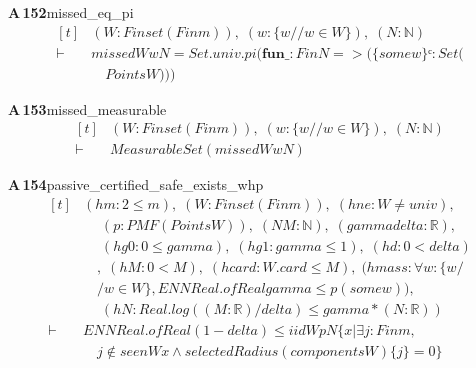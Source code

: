 \documentclass[conference]{IEEEtran}
\theoremstyle{definition}
\newcommand{\lean}[1]{\textsf{\footnotesize #1}}
\begin{document}
\noindent\textbf{A\,152}\quad\lean{missed\_eq\_pi}
{\footnotesize\[ \begin{aligned}[t]
&(\mathit{W} : \mathit{Finset} (\mathit{Fin} \mathit{m})),\; (\mathit{w} : \{ \mathit{w} // \mathit{w} \in \mathit{W}\} ),\; (\mathit{N} : \mathbb{N} )\\
\vdash\;&\mathit{missed} \mathit{W} \mathit{w} \mathit{N} = \mathit{Set}.\mathit{univ}.\mathit{pi} (\mathbf{fun} \mathit{\_} : \mathit{Fin} \mathit{N} => (\{ \mathit{some} \mathit{w}\} ᶜ : \mathit{Set} (\\
&\quad \mathit{Points} \mathit{W})))
\end{aligned} \]}

\noindent\textbf{A\,153}\quad\lean{missed\_measurable}
{\footnotesize\[ \begin{aligned}[t]
&(\mathit{W} : \mathit{Finset} (\mathit{Fin} \mathit{m})),\; (\mathit{w} : \{ \mathit{w} // \mathit{w} \in \mathit{W}\} ),\; (\mathit{N} : \mathbb{N} )\\
\vdash\;&\mathit{MeasurableSet} (\mathit{missed} \mathit{W} \mathit{w} \mathit{N})
\end{aligned} \]}

\noindent\textbf{A\,154}\quad\lean{passive\_certified\_safe\_exists\_whp}
{\footnotesize\[ \begin{aligned}[t]
&(\mathit{hm} : 2 \leq \mathit{m}),\; (\mathit{W} : \mathit{Finset} (\mathit{Fin} \mathit{m})),\; (\mathit{hne} : \mathit{W} \neq \mathit{univ}),\\
&\quad \; (\mathit{p} : \mathit{PMF} (\mathit{Points} \mathit{W})),\; (\mathit{N} \mathit{M} : \mathbb{N} ),\; (\mathit{gamma} \mathit{delta} : \mathbb{R} ),\\
&\quad \; (\mathit{hg0} : 0 \leq \mathit{gamma}),\; (\mathit{hg1} : \mathit{gamma} \leq 1),\; (\mathit{hd} : 0 < \mathit{delta})\\
&\quad ,\; (\mathit{hM} : 0 < \mathit{M}),\; (\mathit{hcard} : \mathit{W}.\mathit{card} \leq \mathit{M}),\; (\mathit{hmass} : \forall \mathit{w} : \{ \mathit{w} /\\
&\quad / \mathit{w} \in \mathit{W}\} , \mathit{ENNReal}.\mathit{ofReal} \mathit{gamma} \leq \mathit{p} (\mathit{some} \mathit{w})),\\
&\quad \; (\mathit{hN} : \mathit{Real}.\mathit{log} ((\mathit{M}:\mathbb{R} )/\mathit{delta}) \leq \mathit{gamma}*(\mathit{N}:\mathbb{R} ))\\
\vdash\;&\mathit{ENNReal}.\mathit{ofReal} (1-\mathit{delta}) \leq \mathit{iid} \mathit{W} \mathit{p} \mathit{N} \{ \mathit{x} | \exists \mathit{j} : \mathit{Fin} \mathit{m},\\
&\quad \mathit{j} \notin \mathit{seen} \mathit{W} \mathit{x} \wedge \mathit{selectedRadius} (\mathit{components} \mathit{W}) \{ \mathit{j}\} = 0\}
\end{aligned} \]}
\end{document}
